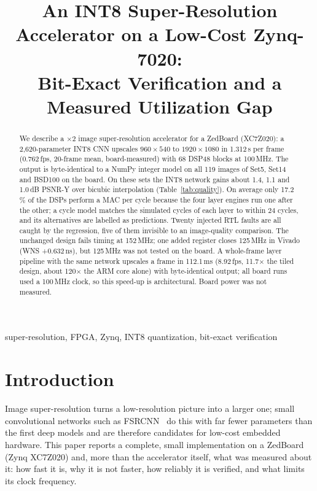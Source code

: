 \documentclass[conference]{IEEEtran}
\begin{document}
\title{An INT8 Super-Resolution Accelerator on a Low-Cost Zynq-7020:\\Bit-Exact Verification and a Measured Utilization Gap}

\author{
}

\maketitle

\begin{abstract}
We describe a $\times 2$ image super-resolution accelerator for a ZedBoard (XC7Z020): a 2{,}620-parameter INT8 CNN upscales $960\times540$ to $1920\times1080$
in 1.312\,s per frame (0.762\,fps, 20-frame mean, board-measured) with 68 DSP48 blocks at 100\,MHz.
The output is byte-identical to a NumPy integer model on all 119 images of Set5, Set14 and BSD100 on the board.
On these sets the INT8 network gains about 1.4, 1.1 and 1.0\,dB PSNR-Y over bicubic interpolation (Table~\ref{tab:quality}).
On average only 17.2\,\% of the DSPs perform a MAC per cycle because the four layer engines run one after the other; a cycle model matches the simulated cycles of each layer to within 24 cycles, and its alternatives are labelled as predictions. Twenty injected RTL faults are all caught by the regression, five of them invisible to an image-quality comparison. The unchanged design fails timing at 152\,MHz; one added register closes 125\,MHz in Vivado (WNS +0.632\,ns), but 125\,MHz was not tested on the board. A whole-frame layer pipeline with the same network upscales a frame in 112.1\,ms (8.92\,fps, 11.7$\times$ the tiled design, about 120$\times$ the ARM core alone) with byte-identical output; all board runs used a 100\,MHz clock, so this speed-up is architectural. Board power was not measured.
\end{abstract}

\begin{IEEEkeywords}
super-resolution, FPGA, Zynq, INT8 quantization, bit-exact verification
\end{IEEEkeywords}

\section{Introduction}
Image super-resolution turns a low-resolution picture into a larger one; small convolutional networks such as FSRCNN~\cite{dong2016fsrcnn} do this with far fewer parameters than the first deep models and are therefore candidates for low-cost embedded hardware.
This paper reports a complete, small implementation on a ZedBoard (Zynq XC7Z020) and, more than the accelerator itself, what was measured about it: how fast it is, why it is not faster, how reliably it is verified, and what limits its clock frequency.
\end{document}
